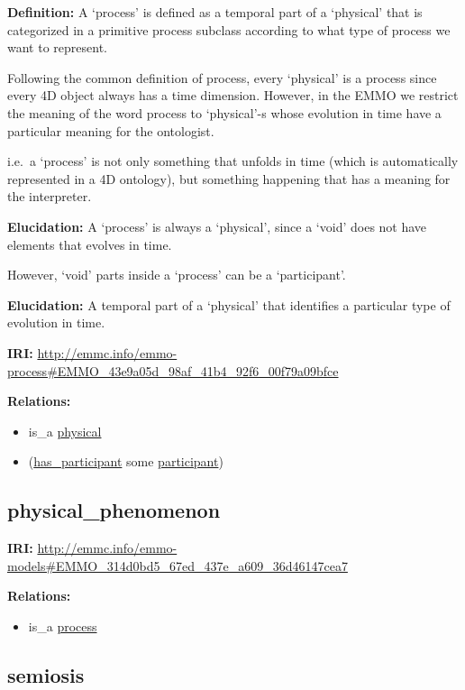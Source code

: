 \documentclass[a4paper,]{report}
\providecommand{\tightlist}{%
  \setlength{\itemsep}{0pt}\setlength{\parskip}{0pt}}
\begin{document}
\textbf{Definition:} A `process' is defined as a temporal part of a
`physical' that is categorized in a primitive process subclass according
to what type of process we want to represent.

Following the common definition of process, every `physical' is a
process since every 4D object always has a time dimension. However, in
the EMMO we restrict the meaning of the word process to `physical'-s
whose evolution in time have a particular meaning for the ontologist.

i.e.~a `process' is not only something that unfolds in time (which is
automatically represented in a 4D ontology), but something happening
that has a meaning for the interpreter.

\textbf{Elucidation:} A `process' is always a `physical', since a `void'
does not have elements that evolves in time.

However, `void' parts inside a `process' can be a `participant'.

\textbf{Elucidation:} A temporal part of a `physical' that identifies a
particular type of evolution in time.

\textbf{IRI:}
\url{http://emmc.info/emmo-process\#EMMO_43e9a05d_98af_41b4_92f6_00f79a09bfce}

\textbf{Relations:}

\begin{itemize}
\tightlist
\item
  is\_a \protect\hyperlink{physical}{physical}
\item
  (\protect\hyperlink{has_participant}{has\_participant} some
  \protect\hyperlink{participant}{participant})
\end{itemize}

\hypertarget{physical_phenomenon}{%
\subsection{physical\_phenomenon}\label{physical_phenomenon}}

\textbf{IRI:}
\url{http://emmc.info/emmo-models\#EMMO_314d0bd5_67ed_437e_a609_36d46147cea7}

\textbf{Relations:}

\begin{itemize}
\tightlist
\item
  is\_a \protect\hyperlink{process}{process}
\end{itemize}

\hypertarget{semiosis}{%
\subsection{semiosis}\label{semiosis}}
\end{document}
